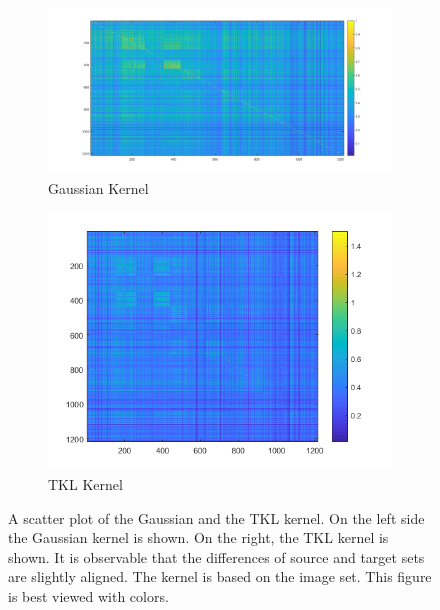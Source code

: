 \begin{figure}
	\centering
	\begin{subfigure}{.5\textwidth}
		\centering
		\includegraphics[width=1\linewidth]{figures/GaussianKernelIMG.png}
		\caption{Gaussian Kernel\label{FigGaussianKernel}}
	\end{subfigure}%
	\begin{subfigure}{.5\textwidth}
		\centering
		\includegraphics[width=1\linewidth]{figures/TKLKernelIMG.png}
		\caption{\acs{TKL} Kernel\label{FigTKLKernel}}
	\end{subfigure}
	\caption[Scatter Plot of Gaussian- and TKL-Kernel]{A scatter plot of the Gaussian and the \acs{TKL} kernel. On the left side the Gaussian kernel is shown. On the right, the \acs{TKL} kernel is shown. It is observable that the differences of source and target sets are slightly aligned. The kernel is based on the image set. This figure is best viewed with colors.\label{FigKernelComparison}}
\end{figure}
